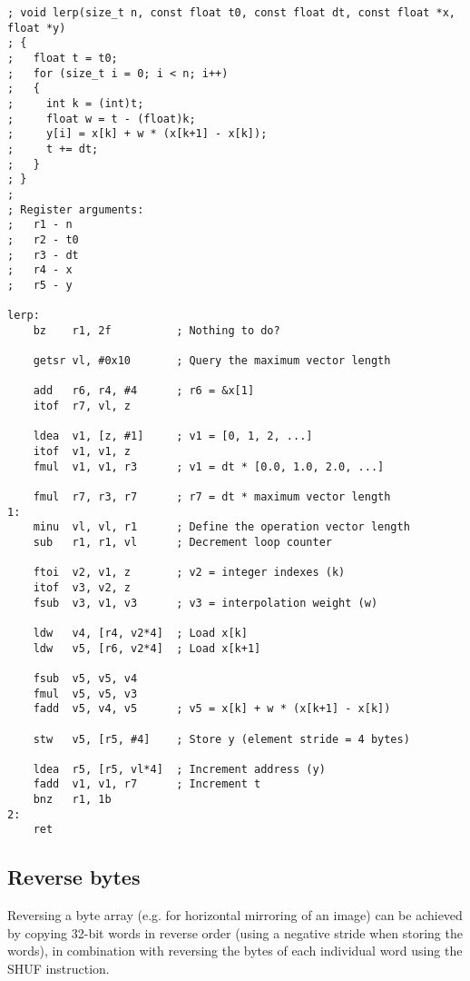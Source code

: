 \begin{lstlisting}[style=assembler]
; void lerp(size_t n, const float t0, const float dt, const float *x, float *y)
; {
;   float t = t0;
;   for (size_t i = 0; i < n; i++)
;   {
;     int k = (int)t;
;     float w = t - (float)k;
;     y[i] = x[k] + w * (x[k+1] - x[k]);
;     t += dt;
;   }
; }
;
; Register arguments:
;   r1 - n
;   r2 - t0
;   r3 - dt
;   r4 - x
;   r5 - y

lerp:
    bz    r1, 2f          ; Nothing to do?

    getsr vl, #0x10       ; Query the maximum vector length

    add   r6, r4, #4      ; r6 = &x[1]
    itof  r7, vl, z

    ldea  v1, [z, #1]     ; v1 = [0, 1, 2, ...]
    itof  v1, v1, z
    fmul  v1, v1, r3      ; v1 = dt * [0.0, 1.0, 2.0, ...]

    fmul  r7, r3, r7      ; r7 = dt * maximum vector length
1:
    minu  vl, vl, r1      ; Define the operation vector length
    sub   r1, r1, vl      ; Decrement loop counter

    ftoi  v2, v1, z       ; v2 = integer indexes (k)
    itof  v3, v2, z
    fsub  v3, v1, v3      ; v3 = interpolation weight (w)

    ldw   v4, [r4, v2*4]  ; Load x[k]
    ldw   v5, [r6, v2*4]  ; Load x[k+1]

    fsub  v5, v5, v4
    fmul  v5, v5, v3
    fadd  v5, v4, v5      ; v5 = x[k] + w * (x[k+1] - x[k])

    stw   v5, [r5, #4]    ; Store y (element stride = 4 bytes)

    ldea  r5, [r5, vl*4]  ; Increment address (y)
    fadd  v1, v1, r7      ; Increment t
    bnz   r1, 1b
2:
    ret
\end{lstlisting}

\subsection{Reverse bytes}

Reversing a byte array (e.g. for horizontal mirroring of an image) can be
achieved by copying 32-bit words in reverse order (using a negative stride when
storing the words), in combination with reversing the bytes of each individual
word using the SHUF instruction.

